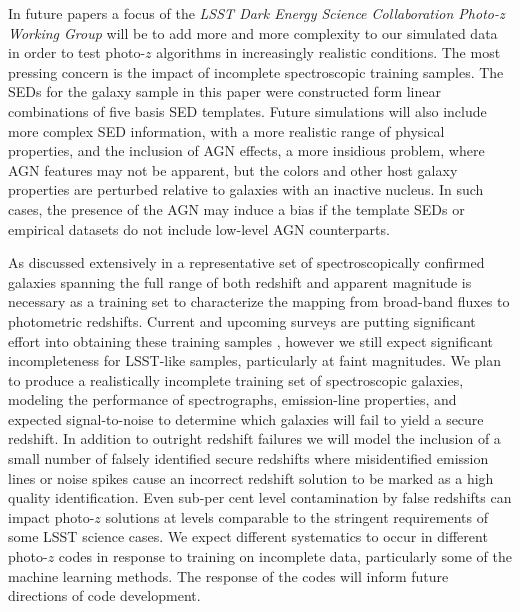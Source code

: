 In future papers a focus of the {\it LSST Dark Energy Science Collaboration Photo-z Working Group} will be to add more and more complexity to our simulated data in order to test photo-$z$ algorithms in increasingly realistic conditions.  The most pressing concern is the impact of incomplete spectroscopic training samples.  The SEDs for the galaxy sample in this paper were constructed form linear combinations of five basis SED templates.  Future simulations will also include more complex SED information, with a more realistic range of physical properties, and the inclusion of AGN effects, a more insidious problem, where AGN features may not be apparent, but the colors and other host galaxy properties are perturbed relative to galaxies with an inactive nucleus.  In such cases, the presence of the AGN may induce a bias if the template SEDs or empirical datasets do not include low-level AGN counterparts.

As discussed extensively in \citet{Newman:2015} a representative set of spectroscopically confirmed galaxies spanning the full range of both redshift and apparent magnitude is necessary as a training set to characterize the mapping from broad-band fluxes to photometric redshifts.
Current and upcoming surveys are putting significant effort into obtaining these training samples \citep[e.~g.\,][]{Masters:2017}, however we still expect significant incompleteness for LSST-like samples, particularly at faint magnitudes.  We plan to produce a realistically incomplete training set of spectroscopic galaxies, modeling the performance of spectrographs, emission-line properties, and expected signal-to-noise to determine which galaxies will fail to yield a secure redshift.  In addition to outright redshift failures we will model the inclusion of a small number of falsely identified secure redshifts where misidentified emission lines or noise spikes cause an incorrect redshift solution to be marked as a high quality identification.  Even sub-per cent level contamination by false redshifts can impact photo-$z$ solutions at levels comparable to the stringent  requirements of some LSST science cases.
We expect different systematics to occur in different photo-$z$ codes in response to training on incomplete data, particularly some of the machine learning methods.  The response of the codes will inform future directions of code development.

